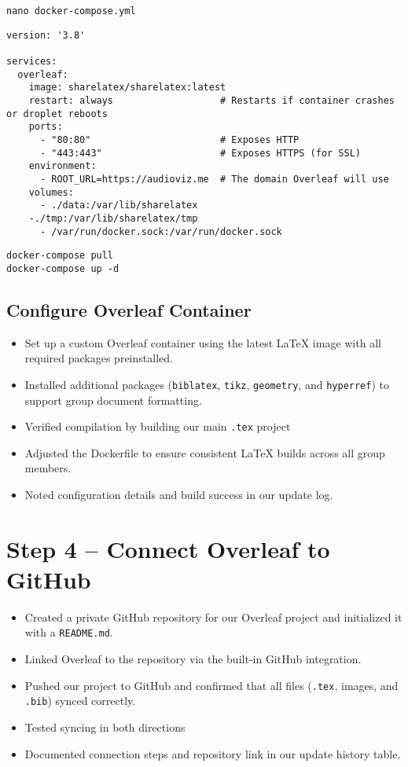 \begin{verbatim}
nano docker-compose.yml
\end{verbatim}

\begin{verbatim}
version: '3.8'

services:
  overleaf:
    image: sharelatex/sharelatex:latest
    restart: always                   # Restarts if container crashes or droplet reboots
    ports:
      - "80:80"                       # Exposes HTTP
      - "443:443"                     # Exposes HTTPS (for SSL)
    environment:
      - ROOT_URL=https://audioviz.me  # The domain Overleaf will use
    volumes:
      - ./data:/var/lib/sharelatex
    -./tmp:/var/lib/sharelatex/tmp
      - /var/run/docker.sock:/var/run/docker.sock
\end{verbatim}

\begin{verbatim}
docker-compose pull
docker-compose up -d
\end{verbatim}

\subsection{Configure Overleaf Container}
\begin{itemize}
  \item Set up a custom Overleaf container using the latest LaTeX image with all required packages preinstalled.
  \item Installed additional packages (\texttt{biblatex}, \texttt{tikz}, \texttt{geometry}, and \texttt{hyperref}) to support group document formatting.
  \item Verified compilation by building our main \texttt{.tex} project 
  \item Adjusted the Dockerfile to ensure consistent LaTeX builds across all group members.
  \item Noted configuration details and build success in our update log.
\end{itemize}

\section{Step 4 – Connect Overleaf to GitHub}
\begin{itemize}
  \item Created a private GitHub repository for our Overleaf project and initialized it with a \texttt{README.md}.
  \item Linked Overleaf to the repository via the built-in GitHub integration.
  \item Pushed our project to GitHub and confirmed that all files (\texttt{.tex}, images, and \texttt{.bib}) synced correctly.
  \item Tested syncing in both directions 
  \item Documented connection steps and repository link in our update history table.
\end{itemize}

